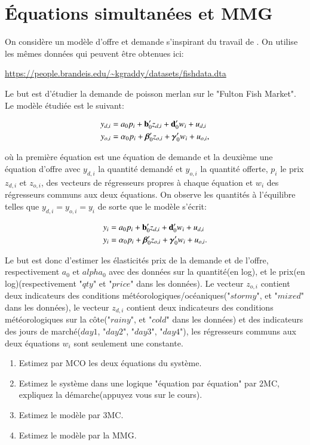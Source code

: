 \section{Équations simultanées et MMG}

On considère un modèle d'offre et demande s'inspirant du travail de \cite{AGI_RES_2000}. 
On utilise les mêmes données qui peuvent être obtenues ici:

\medskip

\url{https://people.brandeis.edu/~kgraddy/datasets/fishdata.dta}

\medskip

Le but est d'étudier la demande de poisson merlan sur le "Fulton Fish Market". 
Le modèle étudiée est le suivant:

\begin{align*}
	y_{d, i} & = a_0 p_i + {\mathbf b}_0^\prime z_{d, i} +  {\mathbf d}_0^\prime w_i + u_{d, i}\\
	y_{o, i} & = \alpha_0 p_i + {\boldsymbol \beta}_0^\prime z_{o, i} + {\boldsymbol \gamma}_0^\prime w_i + u_{o, i},
\end{align*}

où la première équation est une équation de demande et la deuxième une équation d'offre avec $y_{d, i}$ la quantité demandé
et $y_{o, i}$ la quantité offerte, $p_i$ le prix $z_{d, i}$ et $z_{o, i}$, des 
vecteurs de régresseurs propres à chaque équation et $w_i$ des régresseurs communs aux deux équations.
On observe les quantités à l'équilibre telles que $y_{d, i} = y_{o, i} = y_i$ de sorte que le modèle
s'écrit:

\begin{align*}
	y_i & = a_0 p_i + {\mathbf b}_0^\prime z_{d, i} +  {\mathbf d}_0^\prime w_i + u_{d, i}\\
	y_i & = \alpha_0 p_i + {\boldsymbol \beta}_0^\prime z_{o, i} + {\boldsymbol \gamma}_0^\prime w_i + u_{o, i}.
\end{align*}

Le but est donc d'estimer les élasticités prix de la demande et de l'offre, respectivement $a_0$ et $alpha_0$ avec des
 données sur la quantité(en log), et le prix(en log)(respectivement "$qty$" et "$price$" dans les données).
Le vecteur $z_{o, i}$ contient deux indicateurs des conditions météorologiques/océaniques("$stormy$", et "$mixed$" 
dans les données), le vecteur $z_{d, i}$ contient deux indicateurs des conditions météorologiques 
sur la côte("$rainy$", et "$cold$" dans les données) et des indicateurs des jours de marché($day1$, "$day2$", 
"$day3$", "$day4$"), les régresseurs communs aux deux équations $w_i$ sont seulement une constante.

\begin{enumerate}
\item Estimez par MCO les deux équations du système. 
\item Estimez le système dans une logique "équation par équation" par 2MC, 
expliquez la démarche(appuyez vous sur le cours).
\item Estimez le modèle par 3MC. 
\item Estimez le modèle par la MMG.
\end{enumerate}





 
